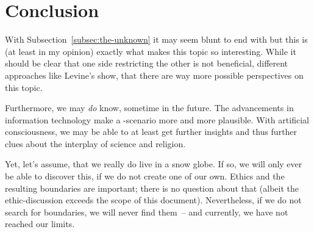 \section{Conclusion}
\label{sec:Conclusion}

With Subsection~\ref{subsec:the-unknown} it may seem blunt to end with  but this is (at least in my opinion) exactly what makes this topic so interesting.
While it should be clear that one side restricting the other is not beneficial, different approaches like Levine's  show, that there are way more possible perspectives on this topic.

Furthermore, we may \emph{do} know, sometime in the future. The advancements in information technology make a -scenario more and more plausible.
With artificial consciousness, we may be able to at least get further insights and thus further clues about the interplay of science and religion.

Yet, let's assume, that we really do live in a snow globe. If so, we will only ever be able to discover this, if we do not create one of our own. Ethics and the resulting boundaries are important; there is no question about that (albeit the ethic-discussion exceeds the scope of this document).
Nevertheless, if we do not search for boundaries, we will never find them~-- and currently, we have not reached our limits.





